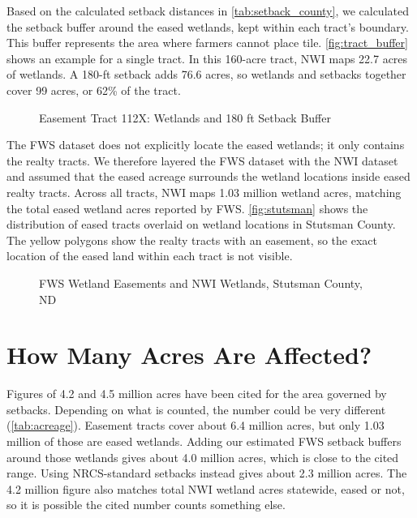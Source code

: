 \documentclass{theme/arpc-memo}
\begin{document}


Based on the calculated setback distances in \autoref{tab:setback_county}, we calculated the setback buffer around the eased wetlands, kept within each tract's boundary. This buffer represents the area where farmers cannot place tile. \autoref{fig:tract_buffer} shows an example for a single tract. In this 160-acre tract, NWI maps 22.7 acres of wetlands. A 180-ft setback adds 76.6 acres, so wetlands and setbacks together cover 99 acres, or 62\% of the tract.

\begin{figure}[htpb!]
\centering
\caption{Easement Tract 112X: Wetlands and 180 ft Setback Buffer}\label{fig:tract_buffer}
\end{figure}

The FWS dataset does not explicitly locate the eased wetlands; it only contains the realty tracts. We therefore layered the FWS dataset with the NWI dataset and assumed that the eased acreage surrounds the wetland locations inside eased realty tracts. Across all tracts, NWI maps 1.03 million wetland acres, matching the total eased wetland acres reported by FWS. \autoref{fig:stutsman} shows the distribution of eased tracts overlaid on wetland locations in Stutsman County. The yellow polygons show the realty tracts with an easement, so the exact location of the eased land within each tract is not visible.

\begin{figure}[htpb!]
\centering
\caption{FWS Wetland Easements and NWI Wetlands, Stutsman County, ND}\label{fig:stutsman}
\end{figure}

\section{How Many Acres Are Affected?}

Figures of 4.2 and 4.5 million acres have been cited for the area governed by setbacks. Depending on what is counted, the number could be very different (\autoref{tab:acreage}). Easement tracts cover about 6.4 million acres, but only 1.03 million of those are eased wetlands. Adding our estimated FWS setback buffers around those wetlands gives about 4.0 million acres, which is close to the cited range. Using NRCS-standard setbacks instead gives about 2.3 million acres. The 4.2 million figure also matches total NWI wetland acres statewide, eased or not, so it is possible the cited number counts something else.
\end{document}
